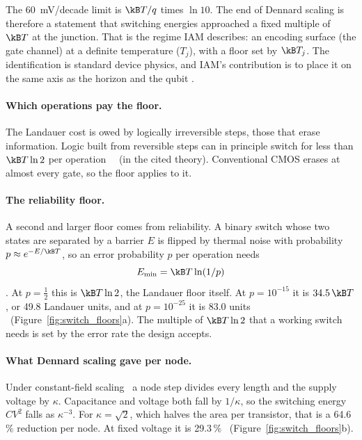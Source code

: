 \begin{keybox}[title={The Dennard wall is a Boltzmann wall}]
The 60~mV/decade limit is $\kB T/q$ times $\ln10$. The end of Dennard scaling is therefore
a statement that switching energies approached a fixed multiple of $\kB T$ at the junction.
That is the regime IAM describes: an encoding surface (the gate channel) at a definite
temperature ($T_j$), with a floor set by $\kB T_j$. The identification is standard device
physics, and IAM's contribution is to place it on the same axis as the horizon and the qubit \interp.
\end{keybox}

\paragraph{Which operations pay the floor.} The Landauer cost is owed by logically irreversible steps, those that
erase information. Logic built from reversible steps can in principle switch for less than $\kB T\ln2$ per
operation~\cite{Bennett1973,Bennett1982} \derived\ (in the cited theory). Conventional CMOS erases at almost every gate, so the floor applies to it.

\paragraph{The reliability floor.} A second and larger floor comes from reliability. A binary switch whose two states
are separated by a barrier $E$ is flipped by thermal noise with probability $p\approx e^{-E/\kB T}$, so an error
probability $p$ per operation needs
\begin{equation}
 E_{\min}=\kB T\ln(1/p)
 \label{eq:reliableswitch}
\end{equation}
\cite{Zhirnov2003}. At $p=\tfrac12$ this is $\kB T\ln2$, the Landauer floor itself. At $p=10^{-15}$ it is
$34.5\,\kB T$, or 49.8 Landauer units, and at $p=10^{-25}$ it is 83.0 units \calc\ (Figure~\ref{fig:switch_floors}a).
The multiple of $\kB T\ln2$ that a working switch needs is set by the error rate the design accepts.

\paragraph{What Dennard scaling gave per node.} Under constant-field scaling~\cite{Dennard1974} a node step divides
every length and the supply voltage by $\kappa$. Capacitance and voltage both fall by $1/\kappa$, so the switching
energy $CV^2$ falls as $\kappa^{-3}$. For $\kappa=\sqrt2$, which halves the area per transistor, that is a 64.6\,\%
reduction per node. At fixed voltage it is 29.3\,\% \derived\ (Figure~\ref{fig:switch_floors}b).

